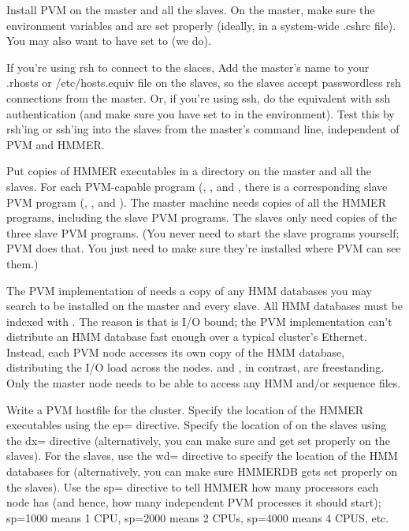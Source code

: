 Install PVM on the master and all the slaves. On the master, make sure
the environment variables  and  are
set properly (ideally, in a system-wide .cshrc file). You may also
want to have  set to  (we do).

If you're using rsh to connect to the slaces, Add the master's name to
your .rhosts or /etc/hosts.equiv file on the slaves, so the slaves
accept passwordless rsh connections from the master. Or, if you're
using ssh, do the equivalent with ssh authentication (and make sure
you have  set to  in the environment). Test
this by rsh'ing or ssh'ing into the slaves from the master's command
line, independent of PVM and HMMER.

Put copies of HMMER executables in a directory on the master and all
the slaves. For each PVM-capable program (,
, and , there is a corresponding slave
PVM program (, , and
). The master machine needs copies of all the HMMER
programs, including the slave PVM programs.  The slaves only need
copies of the three slave PVM programs. (You never need to start the
slave programs yourself; PVM does that. You just need to make sure
they're installed where PVM can see them.)

The PVM implementation of  needs a copy of any HMM
databases you may search to be installed on the master and every
slave. All HMM databases must be indexed with . The
reason is that  is I/O bound; the PVM implementation
can't distribute an HMM database fast enough over a typical cluster's
Ethernet. Instead, each PVM node accesses its own copy of the HMM
database, distributing the I/O load across the nodes.
 and , in contrast, are
freestanding. Only the master node needs to be able to access any HMM
and/or sequence files.

Write a PVM hostfile for the cluster. Specify the location of the
HMMER executables using the ep= directive. Specify the location of
 on the slaves using the dx= directive (alternatively, you
can make sure  and  get set properly
on the slaves). For the slaves, use the wd= directive to specify the
location of the HMM databases for  (alternatively, you
can make sure HMMERDB gets set properly on the slaves). Use the sp=
directive to tell HMMER how many processors each node has (and hence,
how many independent PVM processes it should start); sp=1000 means 1
CPU, sp=2000 means 2 CPUs, sp=4000 means 4 CPUS, etc.

